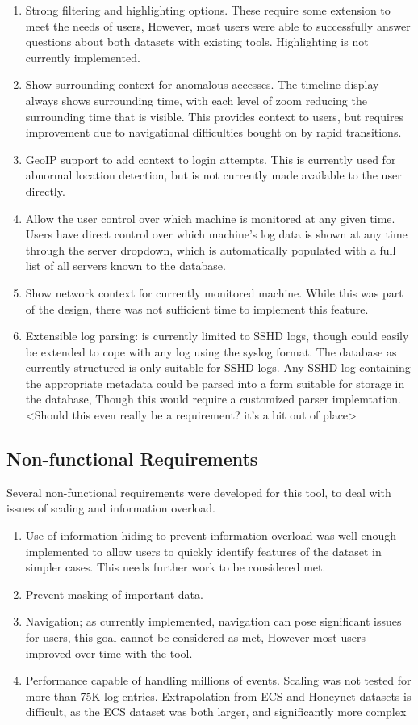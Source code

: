 \begin{enumerate}
\item{Strong filtering and highlighting options. These require some extension to meet the needs of users, However, most users were able to successfully answer questions about both datasets with existing tools. Highlighting is not currently implemented.}
\item{Show surrounding context for anomalous accesses. The timeline display always shows surrounding time, with each level of zoom reducing the surrounding time that is visible. This provides context to users, but requires improvement due to navigational difficulties bought on by rapid transitions.}
\item{GeoIP support to add context to login attempts. This is currently used for abnormal location detection, but is not currently made available to the user directly.}
\item{Allow the user control over which machine is monitored at any given time. Users have direct control over which machine's log data is shown at any time through the server dropdown, which is automatically populated with a full list of all servers known to the database.}
\item{Show network context for currently monitored machine. While this was part of the design, there was not sufficient time to implement this feature.}
\item{Extensible log parsing:  is currently limited to SSHD logs, though could easily be extended to cope with any log using the syslog format. The database as currently structured is only suitable for SSHD logs. Any SSHD log containing the appropriate metadata could be parsed into a form suitable for storage in the database, Though this would require a customized parser implemtation. <Should this even really be a requirement? it's a bit out of place> }
\end{enumerate}

\subsection{Non-functional Requirements}
Several non-functional requirements were developed for this tool, to deal with issues of scaling and information overload.

\begin{enumerate}
\item{Use of information hiding to prevent information overload was well enough implemented to allow users to quickly identify features of the dataset in simpler cases. This needs further work to be considered met.}
\item{Prevent masking of important data.}
\item{Navigation; as currently implemented, navigation can pose significant issues for users, this goal cannot be considered as met, However most users improved over time with the tool.}
\item{Performance capable of handling millions of events. Scaling was not tested for more than 75K log entries. Extrapolation from ECS and Honeynet datasets is difficult, as the ECS dataset was both larger, and significantly more complex}
\end{enumerate}

